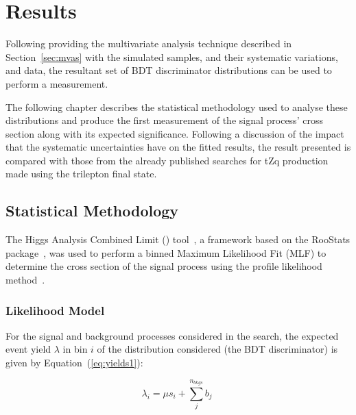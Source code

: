 \chapter{Results}\label{chapter:results}
Following providing the multivariate analysis technique described in Section~\ref{sec:mvas} with the simulated samples, and their systematic variations, and data, the resultant set of BDT discriminator distributions can be used to perform a measurement.

The following chapter describes the statistical methodology used to analyse these distributions and produce the first measurement of the signal process' cross section along with its expected significance.
Following a discussion of the impact that the systematic uncertainties have on the fitted results, the result presented is compared with those from the already published searches for tZq production made using the trilepton final state.

\section{Statistical Methodology}\label{sec:statisticalModel}

The Higgs Analysis Combined Limit (\combine) tool~\cite{Combine}, a framework based on the RooStats package~\cite{Moneta:2010pm,Schott:2012zb}, was used to perform a binned Maximum Likelihood Fit (MLF) to determine the cross section of the signal process using the profile likelihood method~\cite{AsymptoticFormulae}.

\subsection{Likelihood Model}\label{subsec:likelihoodModel}
For the signal and background processes considered in the search, the expected event yield $\lambda$ in bin $i$ of the distribution considered (\ie the BDT discriminator) is given by Equation~(\ref{eq:yields1}):

\begin{equation}
\lambda_{i} = \mu s_{i} + \sum\limits_{j}^{n_{bkgs}} b_{j} \;
\label{eq:yields1}
\end{equation}


